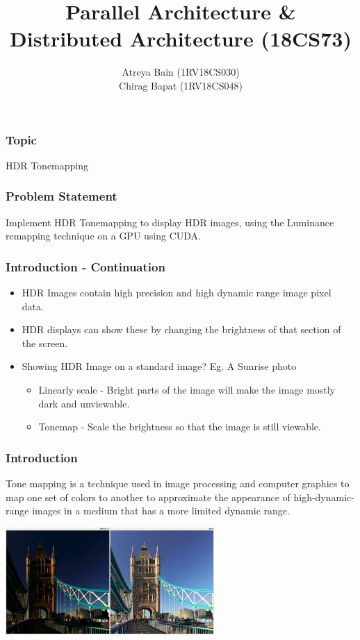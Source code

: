 \documentclass{beamer}
\title{Parallel Architecture \& Distributed Architecture (18CS73)}
\author{Atreya Bain (1RV18CS030)\\Chirag Bapat (1RV18CS048)}
\institute[RVCE]
{
    Submitted To: Dr. Minal Moharir\\
    Associate Professor
    \and
    Self Study Assignment
}
\newcommand{\problemtitle}[0]{HDR Tonemapping}
\begin{document}
\frame{\maketitle}



\begin{frame}
    \frametitle{Topic}
    \begin{center}
        \LARGE{\problemtitle}
    \end{center}
\end{frame}


\begin{frame}
    \frametitle{Problem Statement}
    Implement HDR Tonemapping to display HDR images, using the Luminance remapping technique on a GPU using CUDA.
\end{frame}


\begin{frame}
    \frametitle{Introduction - Continuation}
    \begin{itemize}
        \item HDR Images contain high precision and high dynamic range image pixel data.
        \item HDR displays can show these by changing the brightness of that section of the screen.
        \item Showing HDR Image on a standard image? Eg. A Sunrise photo
        \begin{itemize}
            \item Linearly scale - Bright parts of the image will make the image mostly dark and unviewable.
            \item Tonemap - Scale the brightness so that the image is still viewable.
        \end{itemize}
    \end{itemize}
\end{frame}

\begin{frame}
    \frametitle{Introduction}
    Tone mapping is a technique used in image processing and computer graphics to map one set of colors to another to approximate the appearance of high-dynamic-range images in a medium that has a more limited dynamic range.
    
    \begin{center}
        \includegraphics[width=.75\textwidth]{media/300px-Rt407-ba-tonemapping-hdr-cropped.jpg}
    \end{center}
\end{frame}
\end{document}
